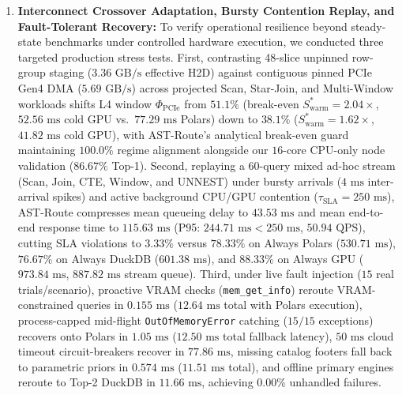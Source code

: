 \documentclass[10pt,a4paper]{article}
\begin{document}
\begin{enumerate}[leftmargin=1.5em,itemsep=2pt]
\item \textbf{Interconnect Crossover Adaptation, Bursty Contention Replay, and Fault-Tolerant Recovery:} To verify operational resilience beyond steady-state benchmarks under controlled hardware execution, we conducted three targeted production stress tests. First, contrasting 48-slice unpinned row-group staging ($3.36\text{ GB/s}$ effective H2D) against contiguous pinned PCIe Gen4 DMA ($5.69\text{ GB/s}$) across projected Scan, Star-Join, and Multi-Window workloads shifts L4 window $\Phi_{\text{PCIe}}$ from $51.1\%$ (break-even $S_{\text{warm}}^* = 2.04\times$, $52.56\text{ ms}$ cold GPU vs.\ $77.29\text{ ms}$ Polars) down to $38.1\%$ ($S_{\text{warm}}^* = 1.62\times$, $41.82\text{ ms}$ cold GPU), with AST-Route's analytical break-even guard maintaining $100.0\%$ regime alignment alongside our $16$-core CPU-only node validation ($86.67\%$ Top-1). Second, replaying a $60$-query mixed ad-hoc stream (Scan, Join, CTE, Window, and UNNEST) under bursty arrivals ($4\text{ ms}$ inter-arrival spikes) and active background CPU/GPU contention ($\tau_{\text{SLA}}=250\text{ ms}$), AST-Route compresses mean queueing delay to $43.53\text{ ms}$ and mean end-to-end response time to $115.63\text{ ms}$ (P95: $244.71\text{ ms} < 250\text{ ms}$, $50.94\text{ QPS}$), cutting SLA violations to $3.33\%$ versus $78.33\%$ on Always Polars ($530.71\text{ ms}$), $76.67\%$ on Always DuckDB ($601.38\text{ ms}$), and $88.33\%$ on Always GPU ($973.84\text{ ms}$, $887.82\text{ ms}$ stream queue). Third, under live fault injection ($15$ real trials/scenario), proactive VRAM checks (\texttt{mem\_\allowbreak{}get\_\allowbreak{}info}) reroute VRAM-constrained queries in $0.155\text{ ms}$ ($12.64\text{ ms}$ total with Polars execution), process-capped mid-flight \texttt{OutOfMemoryError} catching ($15/15$ exceptions) recovers onto Polars in $1.05\text{ ms}$ ($12.50\text{ ms}$ total fallback latency), $50\text{ ms}$ cloud timeout circuit-breakers recover in $77.86\text{ ms}$, missing catalog footers fall back to parametric priors in $0.574\text{ ms}$ ($11.51\text{ ms}$ total), and offline primary engines reroute to Top-2 DuckDB in $11.66\text{ ms}$, achieving $0.00\%$ unhandled failures.
\end{enumerate}
\end{document}
